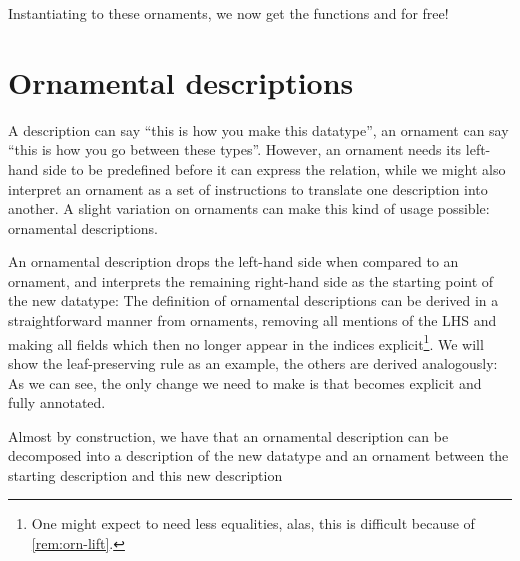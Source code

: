 Instantiating  to these ornaments, we now get the functions  and  for free!



\section{Ornamental descriptions}
A description can say ``this is how you make this datatype'', an ornament can say ``this is how you go between these types''. However, an ornament needs its left-hand side to be predefined before it can express the relation, while we might also interpret an ornament as a set of instructions to translate one description into another. A slight variation on ornaments can make this kind of usage possible: ornamental descriptions.

An ornamental description drops the left-hand side when compared to an ornament, and interprets the remaining right-hand side as the starting point of the new datatype:
The definition of ornamental descriptions can be derived in a straightforward manner from ornaments, removing all mentions of the LHS and making all fields which then no longer appear in the indices explicit\footnote{One might expect to need less equalities, alas, this is difficult because of \autoref{rem:orn-lift}.}. We will show the leaf-preserving rule as an example, the others are derived analogously:
As we can see, the only change we need to make is that  becomes explicit and fully annotated.

Almost by construction, we have that an ornamental description can be decomposed into a description of the new datatype
and an ornament between the starting description and this new description
